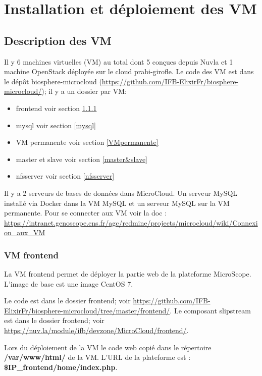\chapter {Installation et déploiement des VM}

\section {Description des VM}

Il y 6 machines virtuelles (VM) au total dont 5 conçues depuis Nuvla et 1 machine OpenStack déployée sur le cloud prabi-girofle.
Le code des VM est dans le dépôt biosphere-microcloud (\url{https://github.com/IFB-ElixirFr/biosphere-microcloud/}); il y a un dossier par VM:

\begin{itemize}
	\item frontend voir section \ref{frontend}
	\item mysql voir section \ref{mysql}
	\item VM permanente voir section \ref{VMpermanente}
	\item master et slave voir section \ref{master&slave}
	\item nfsserver voir section \ref{nfsserver}
\end{itemize}

Il y a 2 serveurs de bases de données dans MicroCloud. Un serveur MySQL installé via Docker dans la VM MySQL et un serveur MySQL sur la VM permanente.
Pour se connecter aux VM voir la doc : \url{https://intranet.genoscope.cns.fr/agc/redmine/projects/microcloud/wiki/Connexion_aux_VM}

\subsection {VM frontend}\label{frontend}

La VM frontend permet de déployer la partie web de la plateforme MicroScope.
L'image de base est une image CentOS 7.

Le code est dans le dossier frontend; voir \url{https://github.com/IFB-ElixirFr/biosphere-microcloud/tree/master/frontend/}.
Le composant slipstream est dans le dossier frontend; voir \url{https://nuv.la/module/ifb/devzone/MicroCloud/frontend/}.
\bigskip

Lors du déploiement de la VM le code web copié dans le répertoire \textbf{/var/www/html/} de la VM.
L'URL de la plateforme est : \textbf{\$IP\_frontend/home/index.php}.

